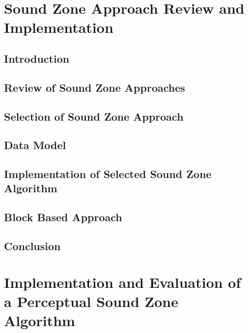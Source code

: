\documentclass[10pt,twoside,openright,titlepage]{ce}
\begin{document}
\chapter{Sound Zone Approach Review and Implementation}
\label{ch:sound_zone}
\section{Introduction}
\label{ch:sound_zone:introduction}

\newpage
\section{Review of Sound Zone Approaches}
\label{ch:sound_zone:approach_review}

\newpage
\section{Selection of Sound Zone Approach}
\label{ch:sound_zone:approach_selection}

\newpage
\section{Data Model}
\label{ch:sound_zone:data_model}

\newpage
\section{Implementation of Selected Sound Zone Algorithm}
\label{ch:sound_zone:approach_implementation}

\newpage
\section{Block Based Approach}
\label{ch:sound_zone:block_based}

\newpage
\section{Conclusion}
\label{ch:sound_zone:conclusion}


\chapter{Implementation and Evaluation of a Perceptual Sound Zone Algorithm}
\label{ch:perceptual_sound_zone}
\end{document}
